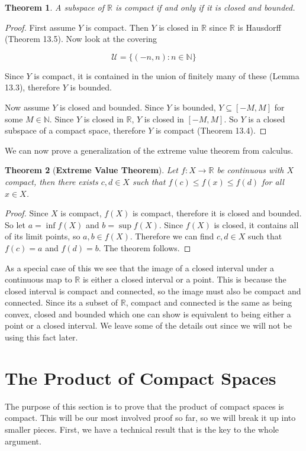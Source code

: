 \documentclass[a4paper]{article}
\newtheorem{theorem}{Theorem}
\numberwithin{theorem}{section}
\begin{document}
\begin{theorem}
A subspace of $\mathbb{R}$ is compact if and only if it is closed and bounded.
\end{theorem}

\begin{proof}
First assume $Y$ is compact. Then $Y$ is closed in $\mathbb{R}$ since $\mathbb{R}$ is Hausdorff (Theorem 13.5). Now look at the covering

$$ \mathcal{U} = \{ (-n,n) : n \in \mathbb{N}\} $$

Since $Y$ is compact, it is contained in the union of finitely many of these (Lemma 13.3), therefore $Y$ is bounded.

Now assume $Y$ is closed and bounded. Since $Y$ is bounded, $Y \subseteq [-M,M]$ for some $M \in \mathbb{N}$. Since $Y$ is closed in $\mathbb{R}$, $Y$ is closed in $[-M,M]$. So $Y$ is a closed subspace of a compact space, therefore $Y$ is compact (Theorem 13.4).

\end{proof}

We can now prove a generalization of the extreme value theorem from calculus.

\begin{theorem}[\textbf{Extreme Value Theorem}]
Let $f: X \rightarrow \mathbb{R}$ be continuous with $X$ compact, then there exists $c,d \in X$ such that $f(c) \leq f(x) \leq f(d)$ for all $x \in X$.
\end{theorem}

\begin{proof}
Since $X$ is compact, $f(X)$ is compact, therefore it is closed and bounded. So let $a = \inf f(X)$ and $b = \sup f(X)$. Since $f(X)$ is closed, it contains all of its limit points, so $a,b \in f(X)$. Therefore we can find $c,d \in X$ such that $f(c) = a$ and $f(d) = b$. The theorem follows.
\end{proof}

As a special case of this we see that the image of a closed interval under a continuous map to $\mathbb{R}$ is either a closed interval or a point. This is because the closed interval is compact and connected, so the image must also be compact and connected. Since its a subset of $\mathbb{R}$, compact and connected is the same as being convex, closed and bounded which one can show is equivalent to being either a point or a closed interval. We leave some of the details out since we will not be using this fact later.


\section{The Product of Compact Spaces}
The purpose of this section is to prove that the product of compact spaces is compact. This will be our most involved proof so far, so we will break it up into smaller pieces. First, we have a technical result that is the key to the whole argument.
\end{document}
